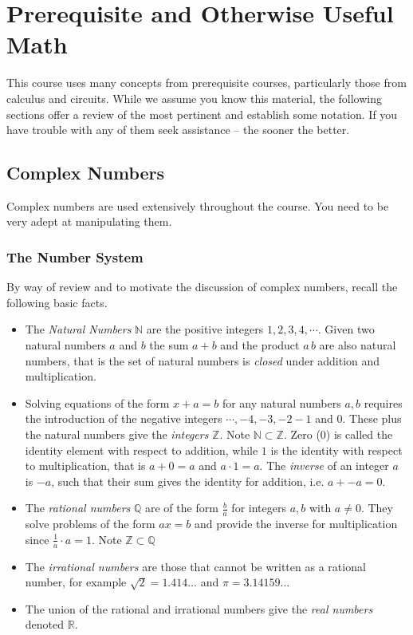 \chapter{Prerequisite and Otherwise Useful Math}

This course uses many concepts from prerequisite courses, particularly those from calculus and circuits. While we assume you know this material, the following sections offer a review of the most pertinent and establish some notation. If you have trouble with any of them seek assistance -- the sooner the better.

\section{Complex Numbers}

Complex numbers are used extensively throughout the course. You need to be very adept at manipulating them.

\subsection*{The Number System}

By way of review and to motivate the discussion of complex numbers, recall the following basic facts.

\begin{itemize}
\item The \emph{Natural Numbers} $\mathbb{N}$ are the positive integers $1,2,3,4,\cdots$. Given two natural numbers $a$ and $b$ the sum $a+b$ and the product $a\,b$ are also natural numbers, that is the set of natural numbers is \emph{closed} under addition and multiplication.

\item Solving equations of the form $x + a = b$ for any natural numbers $a,b$ requires the introduction of the negative integers $\cdots, -4, -3, -2 -1$ and $0$. These plus the natural numbers give the \emph{integers}  $\mathbb{Z}$. Note $\mathbb{N} \subset \mathbb{Z}$. Zero ($0$) is called the identity element with respect to addition, while $1$ is the identity with respect to multiplication, that is $a+0 = a$ and $ a \cdot 1 = a$. The \emph{inverse} of an integer $a$ is $-a$, such that their sum gives the identity for addition, i.e. $a + -a = 0$.

\item The \emph{rational numbers} $\mathbb{Q}$ are of the form $\frac{b}{a}$ for integers $a,b$ with $a \neq 0$. They solve problems of the form $ax=b$ and provide the inverse for multiplication since $\frac{1}{a} \cdot a = 1$. Note $\mathbb{Z} \subset \mathbb{Q}$

\item The \emph{irrational numbers} are those that cannot be written as a rational number, for example $\sqrt{2} = 1.414\ldots$ and $\pi = 3.14159\ldots$

\item The union of the rational and irrational numbers give the \emph{real numbers} denoted $\mathbb{R}$.
\end{itemize}

